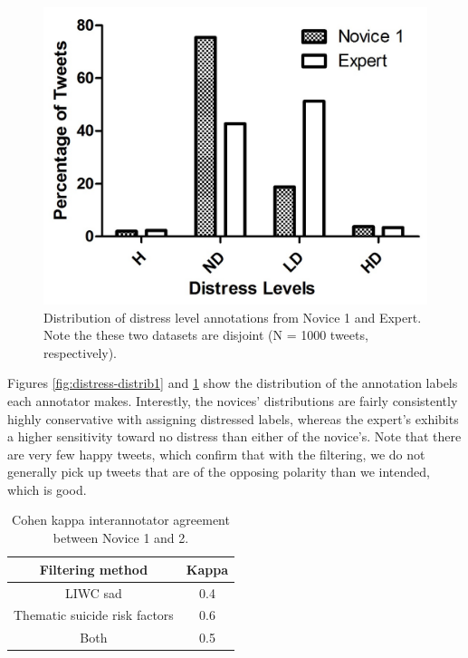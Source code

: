 \documentclass[11pt]{article}
\begin{document}
\begin{figure}
\centering
\includegraphics[scale=0.7]{ChrisMegan4Cat.jpg}
\caption{Distribution of distress level annotations from Novice 1 and Expert. Note the these two datasets are disjoint (N = 1000 tweets, respectively).}
\label{fig:distress-distrib2}
\end{figure}

Figures \ref{fig:distress-distrib1} and \ref{fig:distress-distrib2} show the distribution of the annotation labels each annotator makes. Interestly, the novices' distributions are fairly consistently highly conservative with assigning distressed labels, whereas the expert's exhibits a higher sensitivity toward no distress than either of the novice's.  Note that there are very few happy tweets, which confirm that with the filtering, we do not generally pick up tweets that are of the opposing polarity than we intended, which is good.


\begin{table}[h]
 \centering
\begin{tabular}{|c|c|}
\hline
\textbf{Filtering method}                    & \textbf{Kappa}  \\ \hline
LIWC sad              & 0.4 \\ \hline
Thematic suicide risk factors& 0.6 \\ \hline
Both               & 0.5 \\ \hline
\end{tabular}
\caption {Cohen kappa interannotator agreement between Novice 1 and 2.}
\label{tab:kappa}
\end{table}
\end{document}
